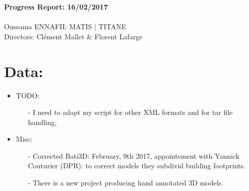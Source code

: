 \documentclass[a4paper, 11pt]{article}
\begin{document}
	\begin{centering}
		\large\textbf{Progress Report: 16/02/2017}\\
		~\\
		Oussama ENNAFII:
		\normalsize MATIS | TITANE \\
		Directors: Cl\'ement Mallet \& Florent Lafarge \\
	\end{centering}


	\section*{Data:}
	
	\begin{itemize}
		\item TODO:
			\begin{itemize}
				\item[-] I need to adapt my script for other XML formats and for tar file handling,

			\end{itemize}
		\item Misc:
			\begin{itemize}
				\item[-] Corrected Bati3D: February, 9th 2017, appointement with Yannick Couturier (DPR): to correct models they subdivid building footprints.
				\item[-] There is a new project producing hand annotated 3D models.
			\end{itemize}
	\end{itemize}
	
\end{document}
